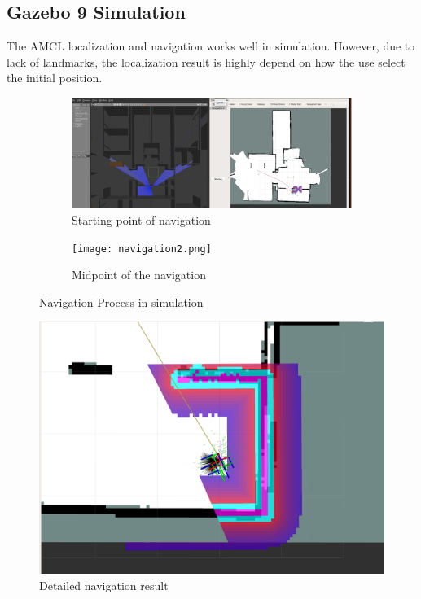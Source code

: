 \documentclass[letterpaper, 10 pt, conference]{ieeeconf}  %
\begin{document}
\subsection{Gazebo 9 Simulation}
The AMCL localization and navigation works well in simulation. However, due to lack of landmarks, the localization result is highly depend on how the use select the initial position.
\begin{figure}[!pt]
    \begin{subfigure}[b]{0.5\textwidth}
       \includegraphics[width=1\linewidth]{navigation.png}
       \caption{Starting point of navigation}
       \label{fig:Ng1} 
    \end{subfigure}
    \begin{subfigure}[b]{0.5\textwidth}
       \texttt{[image: navigation2.png]}
       \caption{Midpoint of the navigation}
       \label{fig:Ng2}
    \end{subfigure}
  \caption{Navigation Process in simulation} 
  \label{fig:navigation_result}
\end{figure}

\begin{figure}[!pt]
  \includegraphics[width=\linewidth]{navigation_detail.png}
  \caption{Detailed navigation result} 
  \label{fig:navigation_detail}
\end{figure}{}
\end{document}
